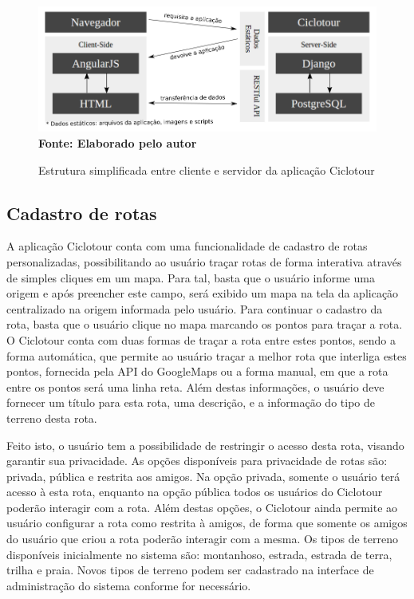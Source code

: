 \begin{figure}[!ht]
	\centering	
	\caption[\hspace{0.1cm} Estrutura simplificada entre cliente e servidor da aplicação Ciclotour.]
	{Estrutura simplificada entre cliente e servidor da aplicação Ciclotour}
	  \vspace{-0.4cm}
	\includegraphics[width=1\textwidth]{figuras/estruturaCiclotour.png}
	 \vspace{-0.3cm}
	\\\textbf{\footnotesize Fonte: Elaborado pelo autor}
	\label{fig:estruturaCiclotour}
\end{figure}

\subsection{Cadastro de rotas}
A aplicação Ciclotour conta com uma funcionalidade de cadastro de rotas personalizadas, possibilitando ao usuário traçar rotas de forma interativa 
através de simples cliques em um mapa. Para tal, basta que o usuário informe uma origem e após preencher este campo, será exibido um mapa na 
tela da aplicação centralizado na origem informada pelo usuário. Para continuar o cadastro da rota, basta que o usuário clique no mapa marcando os 
pontos para traçar a rota. O Ciclotour conta com duas formas de traçar a rota entre estes pontos, sendo a forma automática, que permite ao usuário 
traçar a melhor rota que interliga estes pontos, fornecida pela API do GoogleMaps ou a forma manual, em que a rota entre os pontos será uma linha 
reta. Além destas informações, o usuário deve fornecer um título para esta rota, uma descrição, e a informação do tipo de terreno desta rota. 

Feito isto, o usuário tem a possibilidade de restringir o acesso desta rota, visando garantir sua privacidade. As opções disponíveis para privacidade de 
rotas são: privada, pública e restrita aos amigos. Na opção privada, somente o usuário terá acesso à esta rota, enquanto na opção pública todos os 
usuários do Ciclotour poderão interagir com a rota. Além destas opções, o Ciclotour ainda permite ao usuário configurar a rota como restrita à amigos, 
de forma que somente os amigos do usuário que criou a rota poderão interagir com a mesma. Os tipos de terreno disponíveis inicialmente no sistema 
são: montanhoso, estrada, estrada de terra, trilha e praia. Novos tipos de terreno podem ser cadastrado na interface de administração do sistema 
conforme for necessário.

